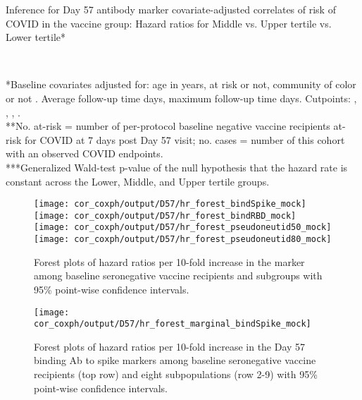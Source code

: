 \documentclass[]{book}
\theoremstyle{definition}
\theoremstyle{definition}
\theoremstyle{definition}
\newcommand{\1}{\mathbbm{1}}
\begin{document}
\begin{table}[H]
\caption{Inference for Day 57 antibody marker covariate-adjusted correlates of risk of COVID in the vaccine group: Hazard ratios for Middle vs. Upper tertile vs. Lower tertile*}
\begin{center}
\setlength{\tabcolsep}{.5ex}
\\
\end{center}
*Baseline covariates adjusted for: age in years, at risk or not, community of color or not
. Average follow-up time  days, maximum follow-up time  days.
Cutpoints:
,  
,  
,  
.
\\
**No. at-risk = number of per-protocol baseline negative vaccine recipients at-risk for COVID at 7 days post Day 57 visit; no. cases = number of this cohort with an observed COVID endpoints.\\
***Generalized Wald-test p-value of the null hypothesis that the hazard rate is constant across the Lower, Middle, and Upper tertile groups.
\end{table}
\begin{figure}[H]
    \texttt{[image: cor\_coxph/output/D57/hr\_forest\_bindSpike\_mock]}
    \texttt{[image: cor\_coxph/output/D57/hr\_forest\_bindRBD\_mock]}
    \texttt{[image: cor\_coxph/output/D57/hr\_forest\_pseudoneutid50\_mock]}
    \texttt{[image: cor\_coxph/output/D57/hr\_forest\_pseudoneutid80\_mock]}
    \caption{Forest plots of hazard ratios per 10-fold increase in the marker among baseline seronegative vaccine recipients and subgroups with 95\% point-wise confidence intervals.}
\end{figure}
\clearpage
\begin{figure}[H]
    \centering
    \texttt{[image: cor\_coxph/output/D57/hr\_forest\_marginal\_bindSpike\_mock]}
    \caption{Forest plots of hazard ratios per 10-fold increase in the Day 57 binding Ab to spike markers among baseline seronegative vaccine recipients (top row) and eight subpopulations (row 2-9) with 95\% point-wise confidence intervals.}
\end{figure}
\end{document}
